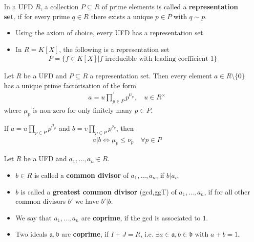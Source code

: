 \begin{dfn}[]
In a UFD $R$, a collection $P \subseteq R$ of prime elements is called a \textbf{representation set}, if for every prime $q \in R$ there exists a unique $p \in P$ with $q \sim p$.
\end{dfn}
\begin{itemize}
  \item Using the axiom of choice, every UFD has a representation set.
  \item In $R = K[X]$, the following is a representation set
    \begin{align*}
      P = \{f \in K[X] \big\vert f \text{ irreducible with leading coefficient } 1\}
    \end{align*}
\end{itemize}


\begin{thm}[]
Let $R$ be a UFD and $P \subseteq R$ a representation set. 
Then every element $a \in R \setminus \{0\}$ has a unique prime factorisation of the form
\begin{align*}
  a = u \prod_{p \in P}^{\prime} p^{\mu_p}, \quad u \in R^{\times}
\end{align*}
where $\mu_p$ is non-zero for only finitely many $p \in P$.

If $a = u \prod_{p \in P}p^{\mu_p}$ and $b = v \prod_{p\in P}p^{\nu_p}$, then
\begin{align*}
  a | b \iff \mu_p \leq \nu_p \quad \forall p \in P
\end{align*}
\end{thm}

\begin{dfn}[]
Let $R$ be a UFD and $a_{1}, \ldots, a_{n} \in R$.
\begin{itemize}
  \item $b \in R$ is called a \textbf{common divisor} of $a_{1}, \ldots, a_{n}$, if $b|a_i$.
  \item $b$ is called a \textbf{greatest common divisor} (gcd,ggT) of $a_{1}, \ldots, a_{n}$, if for all other common divisors $b'$ we have $b'|b$.
  \item We say that $a_{1}, \ldots, a_{n}$ are \textbf{coprime}, if the gcd is associated to $1$.
  \item Two ideals $\mathfrak{a},\mathfrak{b}$ are \textbf{coprime}, if $I+J = R$, i.e. $\exists a\in \mathfrak{a}, b \in \mathfrak{b}$ with $a + b = 1$.
\end{itemize}

\end{dfn}

